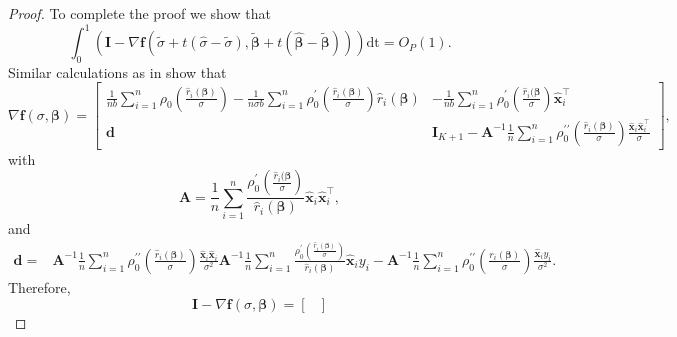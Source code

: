 \documentclass[11pt]{article}
\begin{document}
\begin{proof}
To complete the proof we show that 
\begin{equation}
\int_{0}^1 \left( \mathbf{I}-    \nabla{\mathbf{f}} \left( \widetilde{\sigma} + t \left(\widehat{\sigma} - \widetilde{\sigma} \right),  \boldsymbol{\widetilde{\beta}} + t \left( \boldsymbol{\widehat{\beta}} - \boldsymbol{\widetilde{\beta}} \right) \right) \right) \mathrm{dt} = O_{P}(1).
\end{equation}
Similar calculations as in \cite{salibian2002bootstrapping} show that
\begin{equation*}
\nabla \mathbf{f}(\sigma, \boldsymbol{\beta}) = \begin{bmatrix}
\frac{1}{nb}\sum_{i=1}^n \rho_0\left(\frac{\widehat{r}_i(\boldsymbol{\beta})}{\sigma} \right) - \frac{1}{n \sigma b}\sum_{i=1}^n \rho_0^{\prime} \left( \frac{\widehat{r}_i(\boldsymbol{\beta})}{\sigma}\right)  \widehat{r}_i(\boldsymbol{\beta}) & - \frac{1}{nb} \sum_{i=1}^n \rho_{0}^{\prime} \left( \frac{\widehat{r}_i(\boldsymbol{\beta}}{\sigma}\right)\mathbf{\widehat{x}}_i^{\top} \\ \mathbf{d} & \mathbf{I}_{K+1}-\mathbf{A}^{-1} \frac{1}{n} \sum_{i=1}^n \rho_0^{\prime \prime}\left( \frac{\widehat{r}_i\left(\boldsymbol{\beta} \right)}{\sigma} \right) \frac{\mathbf{\widehat{x}}_i \mathbf{\widehat{x}}_i^{\top}}{\sigma}
\end{bmatrix},
\end{equation*}
with 
\begin{equation*}
\mathbf{A} = \frac{1}{n} \sum_{i=1}^n \frac{ \rho_0^{\prime}\left(\frac{\widehat{r}_i(\boldsymbol{\beta}}{\sigma} \right) }{\widehat{r}_i(\boldsymbol{\beta})} \mathbf{\widehat{x}}_i \mathbf{\widehat{x}}_i^{\top},
 \end{equation*}
and
\begin{align*}
\mathbf{d} = &  \mathbf{A}^{-1}  \frac{1}{n}\sum_{i=1}^n \rho_0 ^{\prime \prime} \left( \frac{\widehat{r}_i(\boldsymbol{\beta})}{\sigma}\right) \frac{\mathbf{\widehat{x}}_i \mathbf{\widehat{x}}_i}{\sigma^2}  \mathbf{A}^{-1} \frac{1}{n}\sum_{i=1}^n  \frac{\rho_0^{\prime} \left(\frac{\widehat{r}_i(\boldsymbol{\beta})}{\sigma} \right)} {\widehat{r}_i(\boldsymbol{\beta})}\mathbf{\widehat{x}}_i y_i  -  \mathbf{A}^{-1}  \frac{1}{n} \sum_{i=1}^n \rho_0^{\prime \prime} \left( \frac{r_i(\boldsymbol{\beta})}{\sigma} \right) \frac{\mathbf{\widehat{x}}_i y_i}{\sigma^2}.
\end{align*}
Therefore,
\begin{equation*}
\mathbf{I} - \nabla \mathbf{f}(\sigma, \boldsymbol{\beta}) = \begin{bmatrix}

\end{bmatrix}
\end{equation*}
\end{proof}
\end{document}
